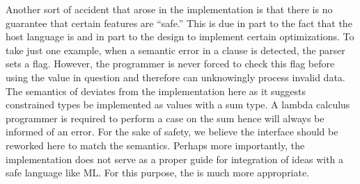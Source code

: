 
Another sort of accident that arose in the
\pads{} implementation is that there is no guarantee that
certain features are ``safe.''  This is due in part to the fact that
the \pads{} host language is \C{} and in part to the design to implement
certain optimizations.  To take just one example, when a 
semantic error in a \Pwhere{} clause is detected, the parser sets a flag.  
However, the \C{} programmer is never forced to check this flag before using 
the value in question and therefore can unknowingly process invalid data.  The 
semantics of \ddc deviates from the \C{} implementation here as it suggests
constrained types be implemented as values with a sum type.  A lambda
calculus programmer is required to perform a case on the sum 
hence will always be informed of an error.
For the sake of safety, we believe the \C{} interface should be reworked 
here to match the semantics.  
Perhaps more importantly, the \C{} implementation does not serve as a
proper guide for integration of \pads{} ideas with a safe language like ML.
For this purpose, the \ddc{} is much more appropriate.






